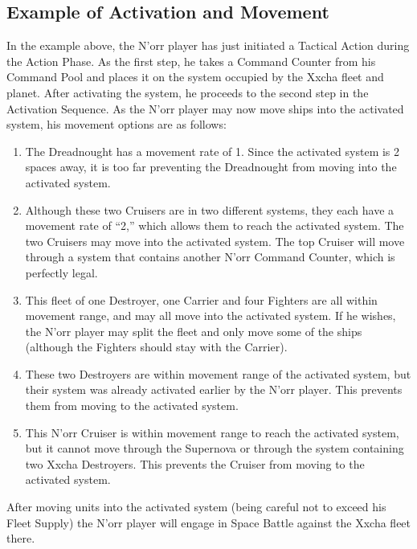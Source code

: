 \documentclass[11pt,fleqn]{book} %
\begin{document}
\subsection{Example of Activation and Movement} %
\label{sub:example_of_activation_and_movement}
In the example above, the N’orr player has just initiated a Tactical Action during the Action Phase. As the first step, he takes a Command Counter from his Command Pool and places it on the system occupied by the Xxcha fleet and planet.
After activating the system, he proceeds to the second step in the Activation Sequence. As the N’orr player may now move ships into the activated system, his movement options are as follows:
\begin{enumerate}
\item The Dreadnought has a movement rate of 1. Since the activated system is 2 spaces away, it is too far preventing the Dreadnought from moving into the activated system.

\item Although these two Cruisers are in two different systems, they each have a movement rate of “2,” which allows them to reach the activated system. The two Cruisers may move into the activated system. The top Cruiser will move through a system that contains another N’orr Command Counter, which is perfectly legal.

\item This fleet of one Destroyer, one Carrier and four Fighters are all within movement range, and may all move into the activated system. If he wishes, the N’orr player may split the fleet and only move some of the ships (although the Fighters should stay with the Carrier).

\item These two Destroyers are within movement range of the activated system, but their system was already activated earlier by the N’orr player. This prevents them from moving to the activated system. 

\item This N’orr Cruiser is within movement range to reach the activated system, but it cannot move through the Supernova or through the system containing two Xxcha Destroyers. This prevents the Cruiser from moving to the activated system.
\end{enumerate}

After moving units into the activated system (being careful not to exceed his Fleet Supply) the N’orr player will engage in Space Battle against the Xxcha fleet there.
\end{document}
